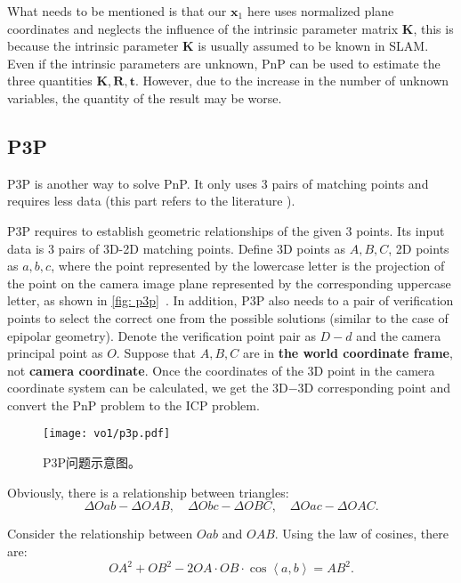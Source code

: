 What needs to be mentioned is that our $\mathbf{x}_1$ here uses normalized plane coordinates and neglects the influence of the intrinsic parameter matrix $\mathbf{K}$, this is because the intrinsic parameter $\mathbf{K}$ is usually assumed to be known in SLAM. Even if the intrinsic parameters are unknown, PnP can be used to estimate the three quantities $\mathbf{K}, \mathbf{R}, \mathbf{t}$. However, due to the increase in the number of unknown variables, the quantity of the result may be worse.

\subsection{P3P}
P3P is another way to solve PnP. It only uses 3 pairs of matching points and requires less data (this part refers to the literature \cite{web:p3p}).

P3P requires to establish geometric relationships of the given 3 points. Its input data is 3 pairs of 3D-2D matching points. Define 3D points as $A, B, C$, 2D points as $a, b, c$, where the point represented by the lowercase letter is the projection of the point on the camera image plane represented by the corresponding uppercase letter, as shown in \autoref{fig: p3p}~. In addition, P3P also needs to a pair of verification points to select the correct one from the possible solutions (similar to the case of epipolar geometry). Denote the verification point pair as $D-d$ and the camera principal point as $O$. Suppose that $A, B, C$ are in \textbf{the world coordinate frame}, not \textbf{camera coordinate}. Once the coordinates of the 3D point in the camera coordinate system can be calculated, we get the 3D−3D corresponding point and convert the PnP problem to the ICP problem.

\begin{figure}[!ht]
	\centering
	\texttt{[image: vo1/p3p.pdf]}
	\caption{P3P问题示意图。}
	\label{fig:p3p}
\end{figure}

Obviously, there is a relationship between triangles:
\begin{equation}
\Delta Oab - \Delta OAB, \quad \Delta Obc - \Delta OBC, \quad \Delta Oac - \Delta OAC.
\end{equation}

Consider the relationship between $Oab$ and $OAB$. Using the law of cosines, there are:
\begin{equation}
O{A^2} + O{B^2} - 2OA \cdot OB \cdot \cos \left\langle a,b \right \rangle  = A{B^2}.
\end{equation}

